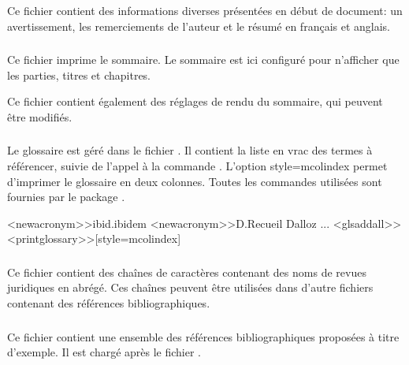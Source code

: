 \documentclass{ltxdockit}
\begin{document}
\subsubsection{}

Ce fichier contient des informations diverses présentées en début de document: un avertissement, les remerciements de l'auteur et le résumé en français et anglais.

\subsubsection{}

Ce fichier imprime le sommaire. Le sommaire est ici configuré pour n'afficher que les parties, titres et chapitres.

Ce fichier contient également des réglages de rendu du sommaire, qui peuvent être modifiés.

\subsubsection{}

Le glossaire est géré dans le fichier . Il contient la liste en vrac des termes à référencer, suivie de l'appel à la commande . L'option style=mcolindex permet d'imprimer le glossaire en deux colonnes. Toutes les commandes utilisées sont fournies par le package .
\begin{ltxexample}
\<<newacronym>>{ibid.}{ibidem}
\<<newacronym>>{D.}{Recueil Dalloz}
...
\<<glsaddall>>
\<<printglossary>>[style=mcolindex]
\end{ltxexample}

\subsubsection{}

Ce fichier contient des chaînes de caractères \bibtex contenant des noms de revues juridiques en abrégé. Ces chaînes peuvent être utilisées dans d'autre fichiers contenant des références bibliographiques.

\subsubsection{}

Ce fichier contient une ensemble des références bibliographiques proposées à titre d'exemple. Il est chargé après le fichier .
\end{document}
